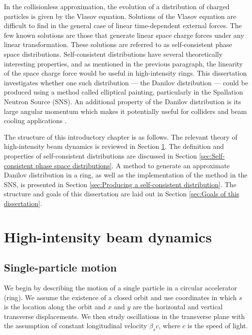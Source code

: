 In the collisionless approximation, the evolution of a distribution of charged particles is given by the Vlasov equation. Solutions of the Vlasov equation are difficult to find in the general case of linear time-dependent external forces. The few known solutions are those that generate linear space charge forces under any linear transformation. These solutions are referred to as self-consistent phase space distributions. Self-consistent distributions have several theoretically interesting properties, and as mentioned in the previous paragraph, the linearity of the space charge force would be useful in high-intensity rings. This dissertation investigates whether one such distribution — the Danilov distribution — could be produced using a method called elliptical painting, particularly in the Spallation Neutron Source (SNS). An additional property of the Danilov distribution is its large angular momentum which makes it potentially useful for colliders and beam cooling applications \cite{Burov2013}.

The structure of this introductory chapter is as follows. The relevant theory of high-intensity beam dynamics is reviewed in Section \ref{sec:High-intensity beam dynamics}. The definition and properties of self-consistent distributions are discussed in Section \ref{sec:Self-consistent phase space distributions}. A method to generate an approximate Danilov distribution in a ring, as well as the implementation of the method in the SNS, is presented in Section \ref{sec:Producing a self-consistent distribution}. The structure and goals of this dissertation are laid out in Section \ref{sec:Goals of this dissertation}.



\section{High-intensity beam dynamics}\label{sec:High-intensity beam dynamics}

\subsection{Single-particle motion}

We begin by describing the motion of a single particle in a circular accelerator (ring). We assume the existence of a closed orbit and use coordinates in which $s$ is the location along the orbit and $x$ and $y$ are the horizontal and vertical transverse displacements. We then study oscillations in the transverse plane with the assumption of constant longitudinal velocity $\beta_s c$, where $c$ is the speed of light.


